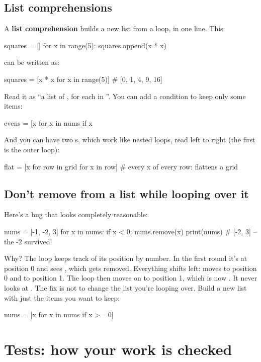 \documentclass[10pt,a4paper]{article}
\begin{document}
\subsection{List comprehensions}
A \textbf{list comprehension} builds a new list from a loop, in one line. This:
\begin{pycode}
squares = []
for x in range(5):
    squares.append(x * x)
\end{pycode}
can be written as:
\begin{pycode}
squares = [x * x for x in range(5)]       # [0, 1, 4, 9, 16]
\end{pycode}
Read it as “a list of , for each  in ”. You can add a condition to keep only some items:
\begin{pycode}
evens = [x for x in nums if x %
\end{pycode}
And you can have two s, which work like nested loops, read left to right (the first  is the outer loop):
\begin{pycode}
flat = [x for row in grid for x in row]   # every x of every row: flattens a grid
\end{pycode}
\subsection{Don’t remove from a list while looping over it}
Here’s a bug that looks completely reasonable:
\begin{pycode}
nums = [-1, -2, 3]
for x in nums:
    if x < 0:
        nums.remove(x)
print(nums)          # [-2, 3]  -- the -2 survived!
\end{pycode}
Why? The  loop keeps track of its position by number. In the first round it’s at position 0 and sees , which gets removed. Everything shifts left:  moves to position 0 and  to position 1. The loop then moves on to position 1, which is now . It never looks at .
The fix is not to change the list you’re looping over. Build a new list with just the items you want to keep:
\begin{pycode}
nums = [x for x in nums if x >= 0]
\end{pycode}
\setcounter{section}{6}
\section{Tests: how your work is checked}
\end{document}
